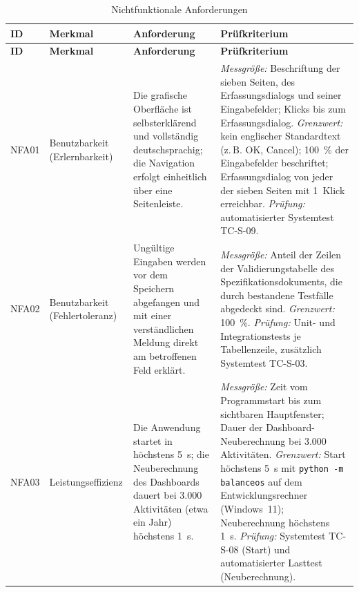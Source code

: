 \begingroup\tabsatz
\begin{longtable}{@{}L{1.2cm}L{3.0cm}L{5.9cm}L{5.1cm}@{}}
  \caption{Nichtfunktionale Anforderungen}\label{tab:nfa}\\
  \toprule
  \textbf{ID} & \textbf{Merkmal} & \textbf{Anforderung} & \textbf{Prüfkriterium} \\
  \midrule
  \endfirsthead
  \toprule
  \textbf{ID} & \textbf{Merkmal} & \textbf{Anforderung} & \textbf{Prüfkriterium} \\
  \midrule
  \endhead
  \endfoot
  \bottomrule
  \endlastfoot
  NFA01 & Benutzbarkeit (Erlernbarkeit)
    & Die grafische Oberfläche ist selbsterklärend und vollständig deutschsprachig; die Navigation erfolgt einheitlich über eine Seitenleiste.
    & \textit{Messgröße:} Beschriftung der sieben Seiten, des Erfassungsdialogs und seiner Eingabefelder; Klicks bis zum Erfassungsdialog.\newline
      \textit{Grenzwert:} kein englischer Standardtext (z.\,B. OK, Cancel); 100~\% der Eingabefelder beschriftet; Erfassungsdialog von jeder der sieben Seiten mit 1~Klick erreichbar.\newline
      \textit{Prüfung:} automatisierter Systemtest TC-S-09. \\
  \midrule
  NFA02 & Benutzbarkeit (Fehlertoleranz)
    & Ungültige Eingaben werden vor dem Speichern abgefangen und mit einer verständlichen Meldung direkt am betroffenen Feld erklärt.
    & \textit{Messgröße:} Anteil der Zeilen der Validierungstabelle des Spezifikationsdokuments, die durch bestandene Testfälle abgedeckt sind.\newline
      \textit{Grenzwert:} 100~\%.\newline
      \textit{Prüfung:} Unit- und Integrationstests je Tabellenzeile, zusätzlich Systemtest TC-S-03. \\
  \midrule
  NFA03 & Leistungs\-effizienz
    & Die Anwendung startet in höchstens 5~s; die Neuberechnung des Dashboards dauert bei 3.000 Aktivitäten (etwa ein Jahr) höchstens 1~s.
    & \textit{Messgröße:} Zeit vom Programmstart bis zum sichtbaren Hauptfenster; Dauer der Dashboard-Neuberechnung bei 3.000 Aktivitäten.\newline
      \textit{Grenzwert:} Start höchstens 5~s mit \texttt{python -m balanceos} auf dem Entwicklungsrechner (Windows~11); Neuberechnung höchstens 1~s.\newline
      \textit{Prüfung:} Systemtest TC-S-08 (Start) und automatisierter Lasttest (Neuberechnung). \\

\end{longtable}
